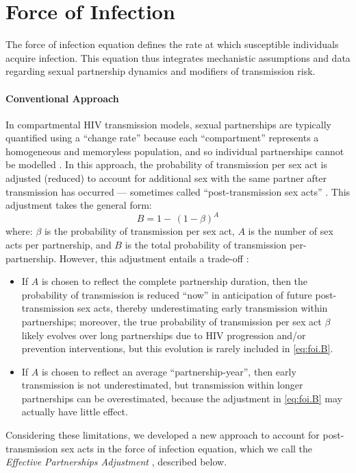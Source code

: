\section{Force of Infection}\label{mod.foi}
The force of infection equation defines the rate at which susceptible individuals acquire infection.
This equation thus integrates mechanistic assumptions and data regarding
sexual partnership dynamics and modifiers of transmission risk.
\paragraph{Conventional Approach}
In compartmental HIV transmission models,
sexual partnerships are typically quantified using a ``change rate''
because each ``compartment'' represents a homogeneous and memoryless population,
and so individual partnerships cannot be modelled \cite{Rao2021}.
In this approach, the probability of transmission per sex act is adjusted (reduced)
to account for additional sex with the same partner after transmission has occurred
--- sometimes called ``post-transmission sex acts'' \cite{Knight2022smdm}.
This adjustment takes the general form:
\begin{equation}\label{eq:foi.B}
  B = 1 -\,{(1-\beta)}^A
\end{equation} where:
$\beta$ is the probability of transmission per sex act,
$A$ is the number of sex acts per partnership, and
$B$ is the total probability of transmission per-partnership.
However, this adjustment entails a trade-off \cite{Knight2022smdm}:
\begin{itemize}
  \item If $A$ is chosen to reflect the complete partnership duration, then
  the probability of transmission is reduced ``now''
  in anticipation of future post-transmission sex acts,
  thereby underestimating early transmission within partnerships;
  moreover, the true probability of transmission per sex act $\beta$
  likely evolves over long partnerships due to
  HIV progression and/or prevention interventions,
  but this evolution is rarely included in \eqref{eq:foi.B}.
  \item If $A$ is chosen to reflect an average ``partnership-year'', then
  early transmission is not underestimated,
  but transmission within longer partnerships can be overestimated,
  because the adjustment in \eqref{eq:foi.B} may actually have little effect.
\end{itemize}
Considering these limitations, we developed
a new approach to account for post-transmission sex acts in the force of infection equation,
which we call the \emph{Effective Partnerships Adjustment} \cite{Knight2022smdm}, described below.

